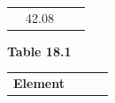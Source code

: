 \begin{enumerate}[noitemsep, label=\textbf{\arabic*}. ]
{{\begin{center}
\begin{tabular}[t]{|l|l|l|l|}
    
         &
    
    
        42.08 &
    
    
     \tabularnewline\cline{1-1}\cline{2-2}\cline{3-3}\cline{4-4}
    \end{tabular}
      \end{center}
    \begin{center}{\small\bfseries Table 18.1}\end{center}
    
    \addtocounter{footnote}{-0}
    
          }{ %
        
    
        \begin{center}
      
      \label{m38717*id276082}
      
    \noindent
      \tablelasttail{}
      \begin{xtabular}[t]{|l|l|l|l|}\hline
    
    
        \textbf{Element} &
    
    

\end{xtabular}
\end{center}}}
\end{enumerate}
